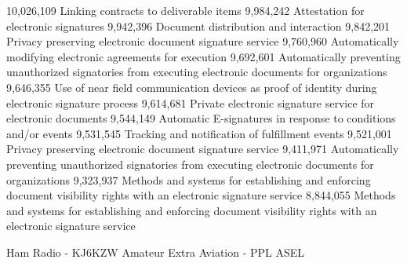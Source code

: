 \documentclass[9pt]{developercv} %
\begin{document}
{10,026,109	Linking contracts to deliverable items}
{9,984,242	Attestation for electronic signatures}
{9,942,396	Document distribution and interaction}
{9,842,201	Privacy preserving electronic document signature service}
{9,760,960	Automatically modifying electronic agreements for execution}
{9,692,601	Automatically preventing unauthorized signatories from executing electronic documents for organizations}
{9,646,355	Use of near field communication devices as proof of identity during electronic signature process}
{9,614,681	Private electronic signature service for electronic documents}
{9,544,149	Automatic E-signatures in response to conditions and/or events}
{9,531,545	Tracking and notification of fulfillment events}
{9,521,001	Privacy preserving electronic document signature service}
{9,411,971	Automatically preventing unauthorized signatories from executing electronic documents for organizations}
{9,323,937	Methods and systems for establishing and enforcing document visibility rights with an electronic signature service}
{8,844,055	Methods and systems for establishing and enforcing document visibility rights with an electronic signature service}

\hfill
\begin{minipage}[t]{0.3\textwidth}
	\vspace{-\baselineskip} %

	Ham Radio - KJ6KZW Amateur Extra
        Aviation - PPL ASEL
\end{minipage}
\hfill

\end{document}
